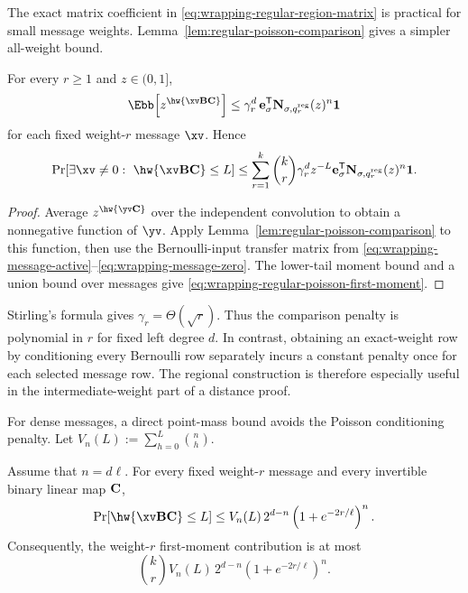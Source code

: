 The exact matrix coefficient in
\eqref{eq:wrapping-regular-region-matrix} is practical for small message
weights.  Lemma~\ref{lem:regular-poisson-comparison} gives a simpler
all-weight bound.

\begin{lemma}
\label{lem:wrapping-regular-poisson-bound}
For every $r\geq1$ and $z\in(0,1]$,
\begin{equation}
 \Ebb\!\left[z^{\hw{\xv\B\C}}\right]
 \leq
 \gamma_r^d\,
 \mathbf e_\sigma^\mathsf{T}
 \mathbf N_{\sigma,q^{\mathrm{reg}}_r}(z)^n\mathbf 1
 \label{eq:wrapping-regular-poisson-mgf}
\end{equation}
for each fixed weight-$r$ message $\xv$.  Hence
\begin{equation}
 \Pr[\exists\xv\ne0:\ \hw{\xv\B\C}\leq L]
 \leq
 \sum_{r=1}^{k}\binom{k}{r}\gamma_r^d z^{-L}
 \mathbf e_\sigma^\mathsf{T}
 \mathbf N_{\sigma,q^{\mathrm{reg}}_r}(z)^n\mathbf 1.
 \label{eq:wrapping-regular-poisson-first-moment}
\end{equation}
\end{lemma}

\begin{proof}
Average $z^{\hw{\yv\C}}$ over the independent convolution to obtain a
nonnegative function of $\yv$.  Apply Lemma~\ref{lem:regular-poisson-comparison}
to this function, then use the Bernoulli-input transfer matrix from
\eqref{eq:wrapping-message-active}--\eqref{eq:wrapping-message-zero}.  The
lower-tail moment bound and a union bound over messages give
\eqref{eq:wrapping-regular-poisson-first-moment}.
\end{proof}

Stirling's formula gives $\gamma_r=\Theta(\sqrt r)$.  Thus the comparison
penalty is polynomial in $r$ for fixed left degree $d$.  In contrast, obtaining
an exact-weight row by conditioning every Bernoulli row separately incurs a
constant penalty once for each selected message row.  The regional
construction is therefore especially useful in the intermediate-weight part
of a distance proof.

For dense messages, a direct point-mass bound avoids the Poisson conditioning
penalty.  Let $V_n(L):=\sum_{h=0}^{L}\binom{n}{h}$.

\begin{lemma}
\label{lem:wrapping-regular-dense-bound}
Assume that $n=d\ell$.  For every fixed weight-$r$ message and every invertible
binary linear map $\mathbf C$,
\begin{equation}
 \Pr[\hw{\xv\B\C}\leq L]
 \leq
 V_n(L)\,2^{d-n}
 \left(1+e^{-2r/\ell}\right)^n.
 \label{eq:wrapping-regular-dense-tail}
\end{equation}
Consequently, the weight-$r$ first-moment contribution is at most
\begin{equation}
 \binom{k}{r}V_n(L)\,2^{d-n}
 \left(1+e^{-2r/\ell}\right)^n.
 \label{eq:wrapping-regular-dense-first-moment}
\end{equation}
\end{lemma}

